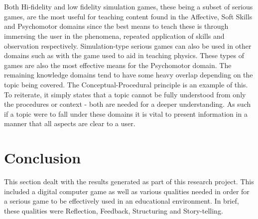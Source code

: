 \\\\
Both Hi-fidelity and low fidelity simulation games, these being a subset of serious games, are the most useful for teaching content found in the Affective, Soft Skills and Psychomotor domains since the best means to teach these is through immersing the user in the phenomena, repeated application of skills and observation respectively. Simulation-type serious games can also be used in other domains such as with the game used to aid in teaching physics. These types of games are also the most effective means for the Psychomotor domain.
\newpage
\noindent The remaining knowledge domains tend to have some heavy overlap depending on the topic being covered. The Conceptual-Procedural principle is an example of this. To reiterate, it simply states that a topic cannot be fully understood from only the procedures or context - both are needed for a deeper understanding. As such if a topic were to fall under these domains it is vital to present information in a manner that all aspects are clear to a user.

\section{Conclusion}
This section dealt with the results generated as part of this research project. This included a digital computer game as well as various qualities needed in order for a serious game to be effectively used in an educational environment. In brief, these qualities were Reflection, Feedback, Structuring and Story-telling. 
